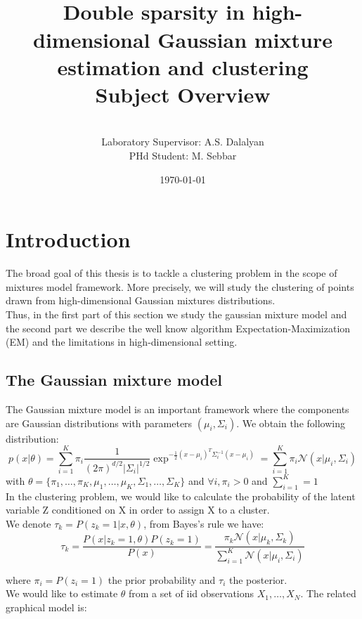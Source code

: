 \documentclass[12pt]{article}
\title{\vspace{-60pt}~\\Double sparsity in high-dimensional Gaussian mixture estimation and clustering\\Subject Overview}
\author{\vspace{-20pt}~\\ Laboratory Supervisor: A.S. Dalalyan\\
PHd Student: M. Sebbar}
\date{\today}
\begin{document}
\maketitle
\tableofcontents
\newpage
\section{Introduction}
The broad goal of this thesis is to tackle a clustering problem in the scope of mixtures model framework. More precisely, we will study the clustering of points drawn from high-dimensional Gaussian mixtures distributions.\\Thus, in the first part of this section we study the gaussian mixture model and the second part we describe the well know algorithm Expectation-Maximization (EM) and the limitations in high-dimensional setting.
\subsection{The Gaussian mixture model}

The Gaussian mixture model is an important framework where the components are Gaussian distributions with parameters $(\mu_i,\Sigma_i)$. We obtain the following distribution:
$$
p(x|\theta)=\sum_{i=1}^K\pi_i\frac{1}{(2\pi)^{d/2}|\Sigma_i|^{1/2}}\exp^{-\frac{1}{2}(x-\mu_i)^T\Sigma_i^{-1}(x-\mu_i)}=\sum_{i=1}^K\pi_i\mathcal N(x|\mu_i,\Sigma_i)
$$
with $\theta=\{\pi_1,\dots,\pi_K,\mu_1,\dots,\mu_K,\Sigma_1,\dots,\Sigma_K\}$ and $\forall i, \pi_i>0$ and $\sum_{i=1}^K=1$
\\

In the clustering problem, we would like to calculate the probability of the latent variable Z conditioned on X in order to assign X to a cluster.\\
We denote $\tau_k=P(z_k=1|x,\theta)$, from Bayes's rule we have:
$$
\tau_k=\frac{P(x|z_k=1,\theta)P(z_k=1)}{P(x)}=\frac{\pi_k \mathcal N(x|\mu_k,\Sigma_k)}{\sum_{i=1}^K\mathcal N(x|\mu_i,\Sigma_i)}
$$

where $\pi_i=P(z_i=1)$ the prior probability and $\tau_i$ the posterior.\\

We would like to estimate $\theta$ from a set of iid observations $X_1,\dots,X_N$. The related graphical model is:

\begin{figure}
\centering
{}
\end{figure}
\end{document}
